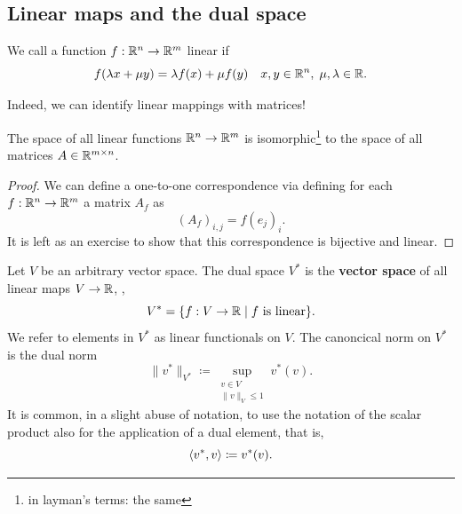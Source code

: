 \subsection{Linear maps and the dual space}

\begin{defn}
    We call a function $f:\mathbb{R}^n\rightarrow \mathbb{R}^m$ linear if 
    \begin{equation}
        f(\lambda x + \mu y) = \lambda f(x) + \mu f(y)\quad x,y\in\mathbb{R}^n, \; \mu,\lambda\in\mathbb{R}.
    \end{equation}
\end{defn}

Indeed, we can identify linear mappings with matrices!
\begin{theorem}
    The space of all linear functions $\mathbb{R}^n\rightarrow \mathbb{R}^m$ is isomorphic\footnote{in layman's terms: the same} to the space of all matrices $A\in \mathbb{R}^{m\times n}$.
\end{theorem}
\begin{proof}
    We can define a one-to-one correspondence via defining for each $f:\mathbb{R}^n\rightarrow\mathbb{R}^m$ a matrix $A_f$ as
    \begin{equation}
        (A_f)_{i,j} = f(e_j)_i.
    \end{equation}
    It is left as an exercise to show that this correspondence is bijective and linear.
\end{proof}

\begin{defn}
    Let $V$ be an arbitrary vector space. The dual space $V^*$ is the \textbf{vector space} of all linear maps $V\rightarrow\mathbb{R}$, \ie,
    \begin{equation}
        V^* = \{f:V\rightarrow \mathbb{R}\;|\; f\text{ is linear}\}.
    \end{equation}
    We refer to elements in $V^*$ as linear functionals on $V$. The canoncical norm on $V^*$ is the dual norm
    \begin{equation}
        \|v^*\|_{V^*} \coloneqq \sup_{\substack{v\in V\\\|v\|_V\leq 1}} v^*(v).
    \end{equation}
    It is common, in a slight abuse of notation, to use the notation of the scalar product also for the application of a dual element, that is, 
    \begin{equation}
        \left\langle v^* , v\right\rangle \coloneqq v^*(v).
    \end{equation}
\end{defn}

